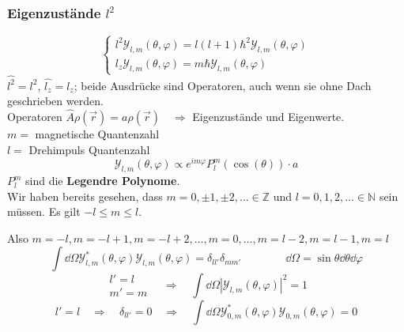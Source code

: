 \subsubsection*{Eigenzustände \texorpdfstring{$ l^2 $}{l2}}

\begin{equation*}
\left\{ \begin{array}{c}
l^2 \mathcal{Y}_{l,m} (\theta, \varphi) = l(l + 1) \hbar^2 \mathcal{Y}_{l,m} (\theta, \varphi) \\
l_z \mathcal{Y}_{l,m} (\theta, \varphi) = m \hbar \mathcal{Y}_{l,m} (\theta, \varphi)
\end{array} \right.
\end{equation*}
$ \hat{l^2} = l^2 $, $ \hat{l_z} = l_z $; beide Ausdrücke sind Operatoren, auch wenn sie ohne Dach geschrieben werden.\\[10pt]
Operatoren $ \hat{A} \rho(\vec{r}) = a \rho (\vec{r}) \quad \Rightarrow $ Eigenzustände und Eigenwerte.\\[10pt]
$ m =  $ magnetische Quantenzahl\\
$ l =  $ Drehimpuls Quantenzahl
\begin{equation*}
\mathcal{Y}_{l,m} (\theta, \varphi) \propto e^{i m \varphi} P_{l}^{m}(\cos(\theta)) \cdot a
\end{equation*}
$ P_{l}^{m} $ sind die \textbf{Legendre Polynome}.\\[10pt]
Wir haben bereits gesehen, dass $ m = 0, \pm 1, \pm 2, \dots \in \mathbb{Z} $ und $ l = 0, 1, 2, \dots \in \mathbb{N} $ sein müssen. Es gilt $ - l \le m \le l $.\par
Also $ m = - l, m = - l + 1, m = - l + 2, \dots, m = 0, \dots, m = l - 2, m = l - 1, m = l  $
\begin{equation*}
\int \dd \Omega \mathcal{Y}_{l, m}^{*}(\theta, \varphi) \mathcal{Y}_{l,m} (\theta, \varphi) = \delta_{l l'} \delta_{m m'} \qquad \qquad \dd \Omega = \sin \theta \dd \theta \dd \varphi
\end{equation*}
\begin{equation*}
\begin{array}{c}
l' = l \\
m' = m
\end{array} \quad \Rightarrow \quad \int \dd \Omega \left|\mathcal{Y}_{l,m} (\theta, \varphi)\right|^2 = 1
\end{equation*}
\begin{equation*}
l' = l \quad \Rightarrow \quad \delta_{ll'} = 0 \quad \Rightarrow \quad \int\dd \Omega \mathcal{Y}_{0,m}^{*} (\theta, \varphi) \mathcal{Y}_{0,m} (\theta, \varphi) = 0
\end{equation*}


